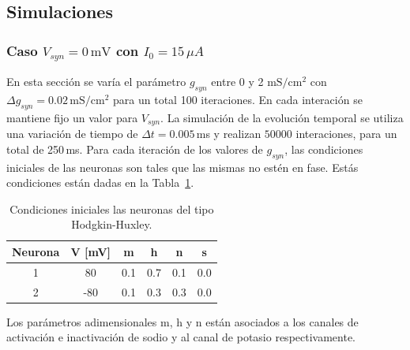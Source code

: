 \subsection{Simulaciones}

   \subsubsection{Caso \texorpdfstring{$V_{syn}= 0\,\text{mV}$}{}   con  \texorpdfstring{$I_0 = 15\,\mu A$}{}}

En esta sección se varía el parámetro $g_{syn}$ entre $0$ y 2 ${\text{mS}}/{\text{cm}^2}$ con $\Delta g_{syn}=0.02\,{\text{mS}}/{\text{cm}^2}$ para un total 100 iteraciones. En cada interación se mantiene fijo un valor para $V_{syn}$. La simulación de la evolución temporal se utiliza una variación de tiempo de $\Delta t =  0.005\,$ms y realizan $50000$ interaciones, para un total de 250\,ms. Para cada iteración de los valores de $g_{syn}$, las condiciones iniciales de las neuronas son tales que las mismas no estén en fase. Estás condiciones están dadas en la Tabla~\ref{tab:ini}. 

\begin{table}[H]
    \centering
    \begin{tabular}{c| c| c |c |c|c}
    Neurona & V [mV] & m    & h     & n     & s     \\ \hline
    1       & 80      & 0.1  & 0.7   & 0.1   & 0.0   \\ \hline
    2       & -80     & 0.1  & 0.3   & 0.3   & 0.0  \\
   \end{tabular}
    \caption{Condiciones iniciales las neuronas del tipo Hodgkin-Huxley.}  
    \label{tab:ini} 
    \end{table}
%
Los parámetros adimensionales m, h y n están asociados a los canales de activación e  inactivación de sodio y al canal de potasio respectivamente.

